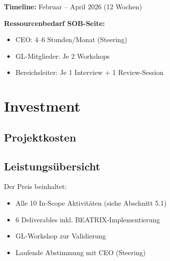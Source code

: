 \documentclass{fehradvice-report}
\begin{document}
\vspace{1cm}

\textbf{Timeline:} Februar -- April 2026 (12 Wochen)

\textbf{Ressourcenbedarf SOB-Seite:}
\begin{itemize}
    \item CEO: 4--6 Stunden/Monat (Steering)
    \item GL-Mitglieder: Je 2 Workshops
    \item Bereichsleiter: Je 1 Interview + 1 Review-Session
\end{itemize}

\newpage
\section{Investment}

\subsection{Projektkosten}

\begin{center}
\end{center}

\vspace{1cm}

\subsection{Leistungsübersicht}

Der Preis beinhaltet:

\begin{itemize}
    \item Alle 10 In-Scope Aktivitäten (siehe Abschnitt 5.1)
    \item 6 Deliverables inkl. BEATRIX-Implementierung
    \item GL-Workshop zur Validierung
    \item Laufende Abstimmung mit CEO (Steering)
\end{itemize}
\end{document}

